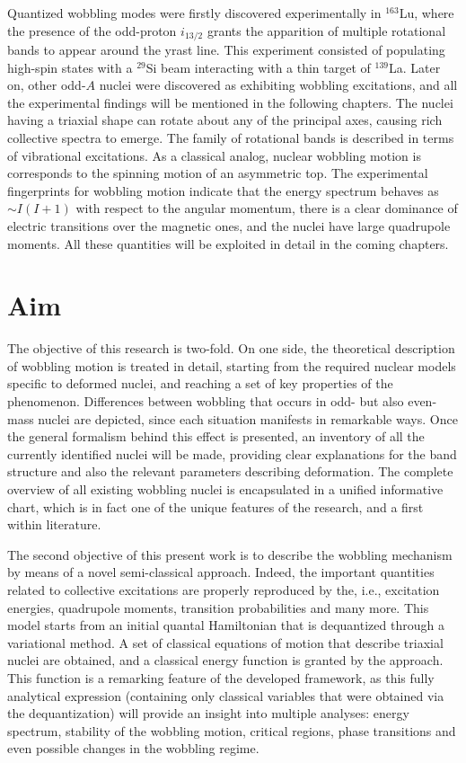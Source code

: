Quantized wobbling modes were firstly discovered experimentally in $^{163}$Lu, where the presence of the odd-proton $i_{13/2}$ grants the apparition of multiple rotational bands to appear around the yrast line. This experiment consisted of populating high-spin states with a $^{29}$Si beam interacting with a thin target of $^{139}$La. Later on, other odd-$A$ nuclei were discovered as exhibiting wobbling excitations, and all the experimental findings will be mentioned in the following chapters. The nuclei having a triaxial shape can rotate about any of the principal axes, causing rich collective spectra to emerge. The family of rotational bands is described in terms of vibrational excitations. As a classical analog, nuclear wobbling motion is corresponds to the spinning motion of an asymmetric top. The experimental fingerprints for wobbling motion indicate that the energy spectrum behaves as $\sim I(I+1)$ with respect to the angular momentum, there is a clear dominance of electric transitions over the magnetic ones, and the nuclei have large quadrupole moments. All these quantities will be exploited in detail in the coming chapters.

\section{Aim}

The objective of this research is two-fold. On one side, the theoretical description of wobbling motion is treated in detail, starting from the required nuclear models specific to deformed nuclei, and reaching a set of key properties of the phenomenon. Differences between wobbling that occurs in odd- but also even-mass nuclei are depicted, since each situation manifests in remarkable ways. Once the general formalism behind this effect is presented, an inventory of all the currently identified nuclei will be made, providing clear explanations for the band structure and also the relevant parameters describing deformation. The complete overview of all existing wobbling nuclei is encapsulated in a unified informative chart, which is in fact one of the unique features of the research, and a first within literature.

The second objective of this present work is to describe the wobbling mechanism by means of a novel semi-classical approach. Indeed, the important quantities related to collective excitations are properly reproduced by the, i.e., excitation energies, quadrupole moments, transition probabilities and many more. This model starts from an initial quantal Hamiltonian that is dequantized through a variational method. A set of classical equations of motion that describe triaxial nuclei are obtained, and a classical energy function is granted by the approach. This function is a remarking feature of the developed framework, as this fully analytical expression (containing only classical variables that were obtained via the dequantization) will provide an insight into multiple analyses: energy spectrum, stability of the wobbling motion, critical regions, phase transitions and even possible changes in the wobbling regime. 

